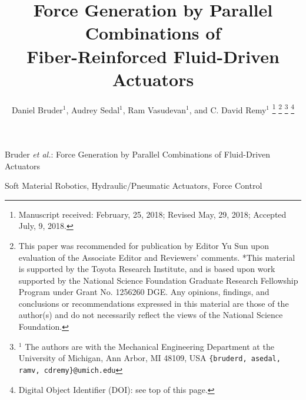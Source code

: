 \documentclass[letterpaper, 10 pt, journal, twoside]{IEEEtran}
\title{\LARGE \bf
Force Generation by Parallel Combinations of \\ Fiber-Reinforced Fluid-Driven Actuators
}
\author{Daniel Bruder$^{1}$, %
        Audrey Sedal$^{1}$, %
        Ram Vasudevan$^{1}$, %
        and C. David Remy$^{1}$%
\thanks{Manuscript received: February, 25, 2018; Revised May, 29, 2018; Accepted July, 9, 2018.}    %
\thanks{This paper was recommended for publication by Editor Yu Sun upon evaluation of the Associate Editor and Reviewers' comments.
*This material is supported by the Toyota Research Institute, and is based upon work supported by the National Science Foundation Graduate Research Fellowship Program under Grant No. 1256260 DGE. Any opinions, findings, and conclusions or recommendations expressed in this material are those of the author(s) and do not necessarily reflect the views of the National Science Foundation.}%
\thanks{$^{1}$ The authors are with the Mechanical Engineering Department at the 
        University of Michigan, Ann Arbor, MI 48109, USA
        {\tt\small \{bruderd, asedal, ramv, cdremy\}@umich.edu}}%
\thanks{Digital Object Identifier (DOI): see top of this page.}
}
\begin{document}
\maketitle

{Bruder \MakeLowercase{\textit{et al.}}: Force Generation by Parallel Combinations of Fluid-Driven Actuators}  %

\begin{abstract}

\end{abstract}

\begin{IEEEkeywords}
Soft Material Robotics, Hydraulic/Pneumatic Actuators, Force Control
\end{IEEEkeywords}

\IEEEpeerreviewmaketitle

% 








% 




\end{document}
